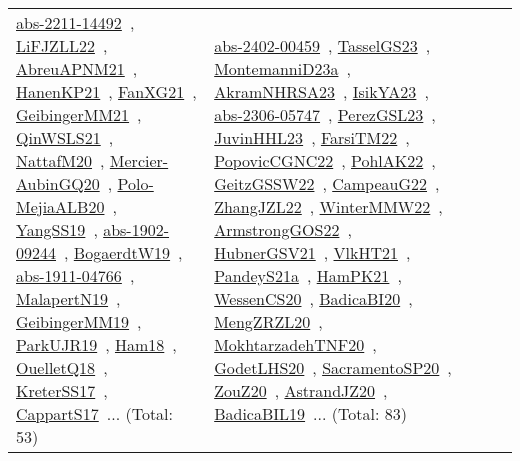 {\begin{longtable}{lp{3cm}>{\raggedright\arraybackslash}p{6cm}>{\raggedright\arraybackslash}p{6cm}>{\raggedright\arraybackslash}p{8cm}}
\href{works/abs-2211-14492.pdf}{abs-2211-14492}~\cite{abs-2211-14492}, \href{works/LiFJZLL22.pdf}{LiFJZLL22}~\cite{LiFJZLL22}, \href{works/AbreuAPNM21.pdf}{AbreuAPNM21}~\cite{AbreuAPNM21}, \href{works/HanenKP21.pdf}{HanenKP21}~\cite{HanenKP21}, \href{works/FanXG21.pdf}{FanXG21}~\cite{FanXG21}, \href{works/GeibingerMM21.pdf}{GeibingerMM21}~\cite{GeibingerMM21}, \href{works/QinWSLS21.pdf}{QinWSLS21}~\cite{QinWSLS21}, \href{works/NattafM20.pdf}{NattafM20}~\cite{NattafM20}, \href{works/Mercier-AubinGQ20.pdf}{Mercier-AubinGQ20}~\cite{Mercier-AubinGQ20}, \href{works/Polo-MejiaALB20.pdf}{Polo-MejiaALB20}~\cite{Polo-MejiaALB20}, \href{works/YangSS19.pdf}{YangSS19}~\cite{YangSS19}, \href{works/abs-1902-09244.pdf}{abs-1902-09244}~\cite{abs-1902-09244}, \href{works/BogaerdtW19.pdf}{BogaerdtW19}~\cite{BogaerdtW19}, \href{works/abs-1911-04766.pdf}{abs-1911-04766}~\cite{abs-1911-04766}, \href{works/MalapertN19.pdf}{MalapertN19}~\cite{MalapertN19}, \href{works/GeibingerMM19.pdf}{GeibingerMM19}~\cite{GeibingerMM19}, \href{works/ParkUJR19.pdf}{ParkUJR19}~\cite{ParkUJR19}, \href{works/Ham18.pdf}{Ham18}~\cite{Ham18}, \href{works/OuelletQ18.pdf}{OuelletQ18}~\cite{OuelletQ18}, \href{works/KreterSS17.pdf}{KreterSS17}~\cite{KreterSS17}, \href{works/CappartS17.pdf}{CappartS17}~\cite{CappartS17}... (Total: 53) & \href{works/abs-2402-00459.pdf}{abs-2402-00459}~\cite{abs-2402-00459}, \href{works/TasselGS23.pdf}{TasselGS23}~\cite{TasselGS23}, \href{works/MontemanniD23a.pdf}{MontemanniD23a}~\cite{MontemanniD23a}, \href{works/AkramNHRSA23.pdf}{AkramNHRSA23}~\cite{AkramNHRSA23}, \href{works/IsikYA23.pdf}{IsikYA23}~\cite{IsikYA23}, \href{works/abs-2306-05747.pdf}{abs-2306-05747}~\cite{abs-2306-05747}, \href{works/PerezGSL23.pdf}{PerezGSL23}~\cite{PerezGSL23}, \href{works/JuvinHHL23.pdf}{JuvinHHL23}~\cite{JuvinHHL23}, \href{works/FarsiTM22.pdf}{FarsiTM22}~\cite{FarsiTM22}, \href{works/PopovicCGNC22.pdf}{PopovicCGNC22}~\cite{PopovicCGNC22}, \href{works/PohlAK22.pdf}{PohlAK22}~\cite{PohlAK22}, \href{works/GeitzGSSW22.pdf}{GeitzGSSW22}~\cite{GeitzGSSW22}, \href{works/CampeauG22.pdf}{CampeauG22}~\cite{CampeauG22}, \href{works/ZhangJZL22.pdf}{ZhangJZL22}~\cite{ZhangJZL22}, \href{works/WinterMMW22.pdf}{WinterMMW22}~\cite{WinterMMW22}, \href{works/ArmstrongGOS22.pdf}{ArmstrongGOS22}~\cite{ArmstrongGOS22}, \href{works/HubnerGSV21.pdf}{HubnerGSV21}~\cite{HubnerGSV21}, \href{works/VlkHT21.pdf}{VlkHT21}~\cite{VlkHT21}, \href{works/PandeyS21a.pdf}{PandeyS21a}~\cite{PandeyS21a}, \href{works/HamPK21.pdf}{HamPK21}~\cite{HamPK21}, \href{works/WessenCS20.pdf}{WessenCS20}~\cite{WessenCS20}, \href{works/BadicaBI20.pdf}{BadicaBI20}~\cite{BadicaBI20}, \href{works/MengZRZL20.pdf}{MengZRZL20}~\cite{MengZRZL20}, \href{works/MokhtarzadehTNF20.pdf}{MokhtarzadehTNF20}~\cite{MokhtarzadehTNF20}, \href{works/GodetLHS20.pdf}{GodetLHS20}~\cite{GodetLHS20}, \href{works/SacramentoSP20.pdf}{SacramentoSP20}~\cite{SacramentoSP20}, \href{works/ZouZ20.pdf}{ZouZ20}~\cite{ZouZ20}, \href{works/AstrandJZ20.pdf}{AstrandJZ20}~\cite{AstrandJZ20}, \href{works/BadicaBIL19.pdf}{BadicaBIL19}~\cite{BadicaBIL19}... (Total: 83)\\

\end{longtable}}
